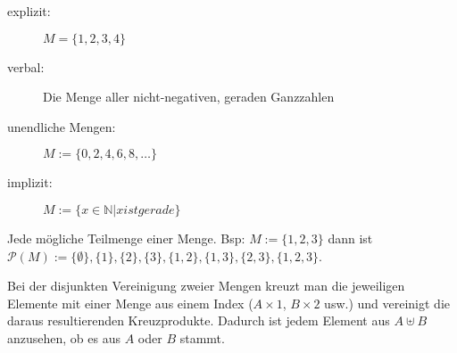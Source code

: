\vspace{-.8cm}

\begin{framed} 
  \begin{description}
    \item [explizit:] $M = \{1,2,3,4\}$
    \item [verbal:] \dq{}Die Menge aller nicht-negativen, geraden Ganzzahlen\dq{}
    \item [unendliche Mengen:] $M := \{0,2,4,6,8,\dots\}$
    \item [implizit:] $M := \{x \in \mathbb{N} | x ist gerade\}$
  \end{description}
\end{framed}

\vspace{-.8cm}

\begin{framed} [Potenzmenge:] 
  Jede mögliche Teilmenge einer Menge. Bsp: $M := \{1,2,3\}$ dann ist
  $\mathcal{P}(M) := \{\emptyset\},\{1\},\{2\},\{3\},\{1,2\},\{1,3\},\{2,3\},\{1,2,3\}$.
\end{framed}

\vspace{-.6cm}

\begin{framed}  
    Bei der disjunkten Vereinigung zweier Mengen kreuzt man die jeweiligen 
    Elemente mit einer Menge aus einem Index ($A \times {1}$, $B \times {2}$ usw.) 
    und vereinigt die daraus resultierenden Kreuzprodukte. 
    Dadurch ist jedem Element aus $A \uplus B$ anzusehen, ob es aus $A$ oder $B$ 
    stammt.
\end{framed}
